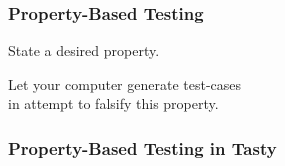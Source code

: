 \begin{frame}[fragile]

\frametitle{Property-Based Testing}

\vspace{\fill}

\begin{center}

State a desired property.

\bigskip

Let your computer generate test-cases \\ in attempt to falsify this property.

\end{center}

\vspace{\fill}

\end{frame}


\begin{frame}

\frametitle{Property-Based Testing in Tasty}



\end{frame}
